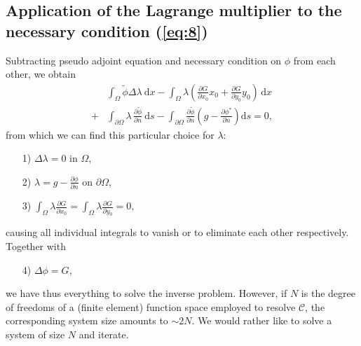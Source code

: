 \subsection{Application of the Lagrange multiplier to the necessary condition (\ref{eq:8})}
Subtracting pseudo adjoint equation and necessary condition on $\phi$ from each other, we obtain
\begin{align}\label{eq:13}
	&\int_\Omega \widetilde{\phi} \Delta\lambda \:\mathrm{d}x
	-\int_\Omega\lambda \left( 
	\frac{\partial G}{\partial x_0}x_0+\frac{\partial G}{\partial y_0}y_0
	\right)\,\mathrm{d}x\\
	+&\int_{\partial \Omega} \lambda \,\frac{\partial\widetilde{\phi}}{\partial n}\:\mathrm{d}s
	-\int_{\partial\Omega} \frac{\partial\widetilde{\phi}}{\partial n} 
		\left(g-\frac{\partial\phi^*}{\partial n}\right) \mathrm{d}s
	= 0,\nonumber
\end{align}
from which we can find this particular choice for $\lambda$:
\begin{itemize}
	\item[1)] $\Delta\lambda=0$ in $\Omega$,
	\item[2)] $\lambda=g-\frac{\partial\phi}{\partial n}$ on $\partial\Omega$,
	\item[3)] $\int_{\Omega}\lambda\frac{\partial G}{\partial x_0}
			  =\int_{\Omega}\lambda\frac{\partial G}{\partial y_0} = 0,$
\end{itemize}
causing all individual integrals to vanish or to eliminate each other respectively.
Together with 
\begin{itemize}
	\item[4)] $\Delta\phi=G$,
\end{itemize}
we have thus everything to solve the inverse problem. However, if $N$ is the degree of freedoms of a (finite element) function space employed to resolve $\mathcal{C}$, the corresponding system size amounts to $\sim 2N$. We would rather like to solve a system of size $N$ and iterate. 


